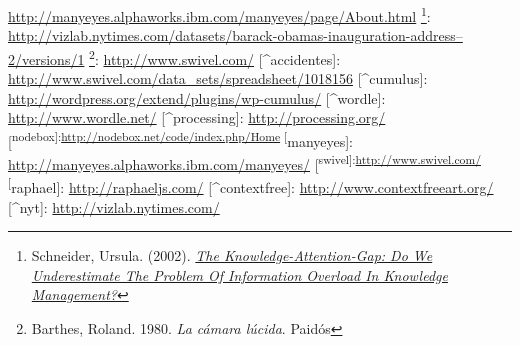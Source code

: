 \documentclass[12pt, a4paper,twoside]{book}
\begin{document}
\href{http://manyeyes.alphaworks.ibm.com/manyeyes/page/About.html}{http://manyeyes.alphaworks.ibm.com/manyeyes/page/About.html}%
\footnote{Schneider, Ursula. (2002).
\emph{\href{http://www.jucs.org/jucs_8_5/the_knowledge_attention_gap/Schneider_U.html}{The Knowledge-Attention-Gap: Do We Underestimate The Problem Of Information Overload In Knowledge Management?}}}:
\href{http://vizlab.nytimes.com/datasets/barack-obamas-inauguration-address-2/versions/1}{http://vizlab.nytimes.com/datasets/barack-obamas-inauguration-address--2/versions/1}%
\footnote{Barthes, Roland. 1980. \emph{La cámara lúcida}. Paidós}:
\href{http://www.swivel.com/}{http://www.swivel.com/}
[\^{}accidentes]:
\href{http://www.swivel.com/data_sets/spreadsheet/1018156}{http://www.swivel.com/data\_sets/spreadsheet/1018156}
[\^{}cumulus]:
\href{http://wordpress.org/extend/plugins/wp-cumulus/}{http://wordpress.org/extend/plugins/wp-cumulus/}
[\^{}wordle]: \href{http://www.wordle.net/}{http://www.wordle.net/}
[\^{}processing]:
\href{http://processing.org/}{http://processing.org/}
[\textsuperscript{nodebox]:\href{http://nodebox.net/code/index.php/Home}{http://nodebox.net/code/index.php/Home} [}manyeyes]:
\href{http://manyeyes.alphaworks.ibm.com/manyeyes/}{http://manyeyes.alphaworks.ibm.com/manyeyes/}
[\textsuperscript{swivel]:\href{http://www.swivel.com/}{http://www.swivel.com/} [}raphael]:
\href{http://raphaeljs.com/}{http://raphaeljs.com/}
[\^{}contextfree]:
\href{http://www.contextfreeart.org/}{http://www.contextfreeart.org/}
[\^{}nyt]:
\href{http://vizlab.nytimes.com/}{http://vizlab.nytimes.com/}
\end{document}
